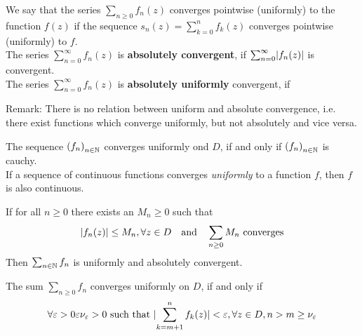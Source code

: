 \begin{definition}
	We say that the series $\sum_{n \geq 0} f_n(z)$ converges pointwise (uniformly) to the function $f(z)$ if the sequence $s_n(z) = \sum_{k=0}^{n}f_k(z)$ converges pointwise (uniformly) to $f$.\\
	The series $\sum_{n=0}^{\infty}f_n(z)$ is \textbf{absolutely convergent}, if $\sum_{n = 0}^{\infty}\abs{f_n(z)}$ is convergent.\\
	The series $\sum_{n=0}^{\infty}f_n(z)$ is \textbf{absolutely uniformly}  convergent,  if
\end{definition}
Remark: There is no relation between uniform and absolute convergence, i.e. there exist functions which converge uniformly, but not absolutely and vice versa.\\

\begin{proposition}[]
	The sequence $\left(f_{n}\right)_{n \in \mathbb{N}}$ converges uniformly ond $D$, if and only if $\left(f_{n}\right)_{n \in \mathbb{N}}$ is cauchy.\\
	If a sequence of continuous functions converges \emph{uniformly} to a function $f$, then $f$ is also continuous.
\end{proposition}

\begin{ntheorem}
	If for all $n \geq 0$ there exists an $M_n \geq 0$ such that
\begin{align*}
	\vert f_n(z)\vert \leq M_n, \forall z \in D \quad \text{and} \quad \sum_{n \geq 0} M_n \text{ converges}
\end{align*}
Then $\sum_{n \in \mathbb{N}}f_n$ is uniformly and absolutely convergent.
\end{ntheorem}


\begin{nlemma}
The sum $\sum_{n \geq 0}f_n$ converges uniformly on $D$, if and only if 
\begin{align*}
	\forall \epsilon > 0 \epsilon \nu_{\epsilon} > 0 \text{ such that } \abs{\sum_{k = m+1}^{n}f_k(z)} < \epsilon, \forall z \in D, n > m \geq \nu_{\epsilon}
\end{align*}
\end{nlemma}



